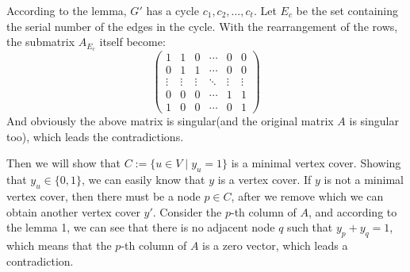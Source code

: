According to the lemma, $G'$ has a cycle $c_1, c_2, \dots, c_t$. Let $E_c$ be the set containing the serial number of the edges in the cycle. With the rearrangement of the rows, the submatrix $A_{E_c}$ itself become:
\[
\begin{pmatrix}
      1    &    1   &    0   & \cdots &    0   &    0   \\
      0    &    1   &    1   & \cdots &    0   &    0   \\
    \vdots & \vdots & \vdots & \ddots & \vdots & \vdots \\
      0    &    0   &    0   & \cdots &    1   &    1   \\
      1    &    0   &    0   & \cdots &    0   &    1
\end{pmatrix}
\]
And obviously the above matrix is singular(and the original matrix $A$ is singular too), which leads the contradictions.\par
Then we will show that $C:=\{u \in V \mid y_u = 1\}$ is a minimal vertex cover. Showing that $y_u \in \{0, 1\}$, we can easily know that $y$ is a vertex cover. If $y$ is not a minimal vertex cover, then there must be a node $p \in C$, after we remove which we can obtain another vertex cover $y'$. Consider the $p$-th column of $A$, and according to the lemma 1, we can see that there is no adjacent node $q$ such that $y_p + y_q = 1$, which means that the $p$-th column of $A$ is a zero vector, which leads a contradiction.
